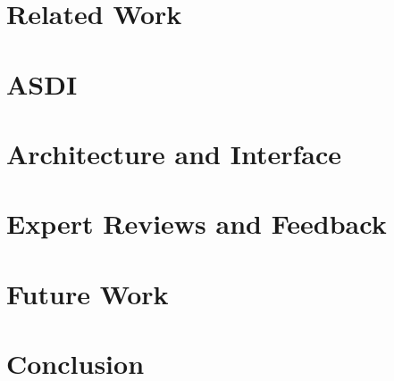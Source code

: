 \documentclass{sig-alternate}
\begin{document}
\section{Related Work}
\label{sec-related-work}


\section{ASDI}
\label{sec-asdi}

\section{Architecture and Interface}
\label{sec-arch}


\section{Expert Reviews and Feedback}
\label{sec-expert-review}

\section{Future Work}
\label{sec-future-work}

\section{Conclusion}
\label{sec-conclusion}



\begin{small}

\end{small}
\end{document}
